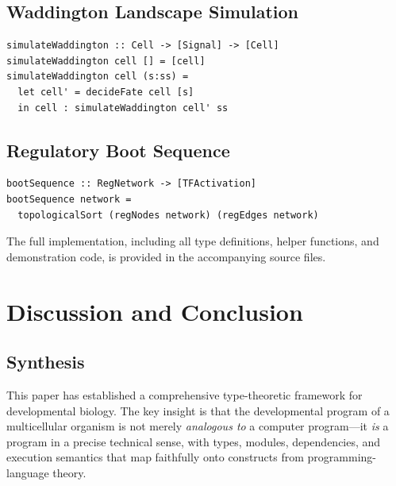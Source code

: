 \documentclass[12pt,a4paper]{article}
\begin{document}
\subsection{Waddington Landscape Simulation}

\begin{lstlisting}
simulateWaddington :: Cell -> [Signal] -> [Cell]
simulateWaddington cell [] = [cell]
simulateWaddington cell (s:ss) =
  let cell' = decideFate cell [s]
  in cell : simulateWaddington cell' ss
\end{lstlisting}

\subsection{Regulatory Boot Sequence}

\begin{lstlisting}
bootSequence :: RegNetwork -> [TFActivation]
bootSequence network =
  topologicalSort (regNodes network) (regEdges network)
\end{lstlisting}

The full implementation, including all type definitions, helper
functions, and demonstration code, is provided in the accompanying
source files.


\section{Discussion and Conclusion}\label{sec:discussion}

\subsection{Synthesis}

This paper has established a comprehensive type-theoretic framework
for developmental biology.  The key insight is that the developmental
program of a multicellular organism is not merely \emph{analogous to}
a computer program---it \emph{is} a program in a precise technical
sense, with types, modules, dependencies, and execution semantics
that map faithfully onto constructs from programming-language theory.
\end{document}
